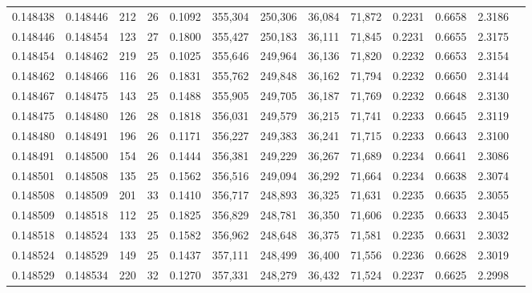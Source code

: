 \begin{tabular}{rrrrrrrrrrrrr}
0.148438 & 0.148446 & 212 &  26 &                                     0.1092 & 355,304 & 250,306 &  36,084 &  71,872 & 0.2231 & 0.6658 & 2.3186 \\
0.148446 & 0.148454 & 123 &  27 &                                     0.1800 & 355,427 & 250,183 &  36,111 &  71,845 & 0.2231 & 0.6655 & 2.3175 \\
0.148454 & 0.148462 & 219 &  25 &                                     0.1025 & 355,646 & 249,964 &  36,136 &  71,820 & 0.2232 & 0.6653 & 2.3154 \\
0.148462 & 0.148466 & 116 &  26 &                                     0.1831 & 355,762 & 249,848 &  36,162 &  71,794 & 0.2232 & 0.6650 & 2.3144 \\
0.148467 & 0.148475 & 143 &  25 &                                     0.1488 & 355,905 & 249,705 &  36,187 &  71,769 & 0.2232 & 0.6648 & 2.3130 \\
0.148475 & 0.148480 & 126 &  28 &                                     0.1818 & 356,031 & 249,579 &  36,215 &  71,741 & 0.2233 & 0.6645 & 2.3119 \\
0.148480 & 0.148491 & 196 &  26 &                                     0.1171 & 356,227 & 249,383 &  36,241 &  71,715 & 0.2233 & 0.6643 & 2.3100 \\
0.148491 & 0.148500 & 154 &  26 &                                     0.1444 & 356,381 & 249,229 &  36,267 &  71,689 & 0.2234 & 0.6641 & 2.3086 \\
0.148501 & 0.148508 & 135 &  25 &                                     0.1562 & 356,516 & 249,094 &  36,292 &  71,664 & 0.2234 & 0.6638 & 2.3074 \\
0.148508 & 0.148509 & 201 &  33 &                                     0.1410 & 356,717 & 248,893 &  36,325 &  71,631 & 0.2235 & 0.6635 & 2.3055 \\
0.148509 & 0.148518 & 112 &  25 &                                     0.1825 & 356,829 & 248,781 &  36,350 &  71,606 & 0.2235 & 0.6633 & 2.3045 \\
0.148518 & 0.148524 & 133 &  25 &                                     0.1582 & 356,962 & 248,648 &  36,375 &  71,581 & 0.2235 & 0.6631 & 2.3032 \\
0.148524 & 0.148529 & 149 &  25 &                                     0.1437 & 357,111 & 248,499 &  36,400 &  71,556 & 0.2236 & 0.6628 & 2.3019 \\
0.148529 & 0.148534 & 220 &  32 &                                     0.1270 & 357,331 & 248,279 &  36,432 &  71,524 & 0.2237 & 0.6625 & 2.2998 \\

\end{tabular}
